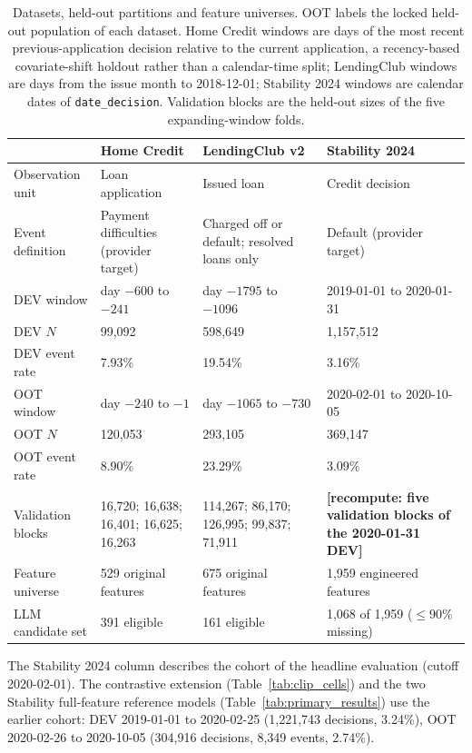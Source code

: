\documentclass[final,5p,twocolumn]{elsarticle}
\begin{document}
\begin{table}[htbp]
\centering
\footnotesize
\begin{threeparttable}
\caption{Datasets, held-out partitions and feature universes. OOT labels the locked held-out population of each dataset. Home Credit windows are days of the most recent previous-application decision relative to the current application, a recency-based covariate-shift holdout rather than a calendar-time split; LendingClub windows are days from the issue month to 2018-12-01; Stability 2024 windows are calendar dates of \texttt{date\_decision}. Validation blocks are the held-out sizes of the five expanding-window folds.}
\label{tab:datasets}
\begin{tabular}{@{}lL{29mm}L{31mm}L{31mm}@{}}
\toprule
 & Home Credit & LendingClub v2 & Stability 2024 \\
\midrule
Observation unit & Loan application & Issued loan & Credit decision \\
Event definition & Payment difficulties (provider target) & Charged off or default; resolved loans only & Default (provider target) \\
DEV window & day $-600$ to $-241$ & day $-1795$ to $-1096$ & 2019-01-01 to 2020-01-31 \\
DEV $N$ & 99,092 & 598,649 & 1,157,512 \\
DEV event rate & 7.93\% & 19.54\% & 3.16\% \\
OOT window & day $-240$ to $-1$ & day $-1065$ to $-730$ & 2020-02-01 to 2020-10-05 \\
OOT $N$ & 120,053 & 293,105 & 369,147 \\
OOT event rate & 8.90\% & 23.29\% & 3.09\% \\
Validation blocks & 16,720; 16,638; 16,401; 16,625; 16,263 & 114,267; 86,170; 126,995; 99,837; 71,911 & \textbf{[recompute: five validation blocks of the 2020-01-31 DEV]} \\ %
Feature universe & 529 original features & 675 original features & 1,959 engineered features \\
LLM candidate set & 391 eligible & 161 eligible & 1,068 of 1,959 ($\le$90\% missing) \\
\bottomrule
\end{tabular}
\begin{tablenotes}\footnotesize
\item The Stability 2024 column describes the cohort of the headline evaluation (cutoff 2020-02-01). The contrastive extension (Table~\ref{tab:clip_cells}) and the two Stability full-feature reference models (Table~\ref{tab:primary_results}) use the earlier cohort: DEV 2019-01-01 to 2020-02-25 (1,221,743 decisions, 3.24\%), OOT 2020-02-26 to 2020-10-05 (304,916 decisions, 8,349 events, 2.74\%).
\end{tablenotes}
\end{threeparttable}
\end{table}
\end{document}
